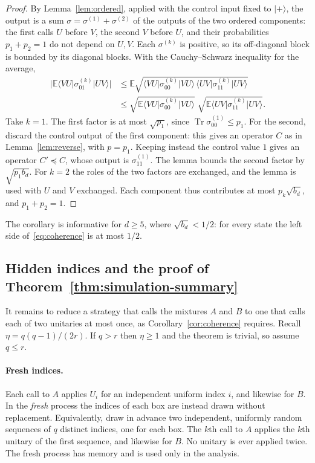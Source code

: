 \documentclass[11pt,letterpaper]{article}
\theoremstyle{definition}\newtheorem{definition}[theorem]{Definition}
\newcommand{\E}{\mathbb E}
\newcommand{\Tr}{\operatorname{Tr}}
\newcommand{\ket}[1]{\lvert#1\rangle}
\newcommand{\bra}[1]{\langle#1\rvert}
\begin{document}
\begin{proof}
By Lemma~\ref{lem:ordered}, applied with the control input fixed to
$\ket+$, the output is a sum $\sigma=\sigma^{(1)}+\sigma^{(2)}$ of the
outputs of the two ordered components: the first calls $U$ before $V$,
the second $V$ before $U$, and their probabilities $p_1+p_2=1$ do not
depend on $U,V$.
Each $\sigma^{(k)}$ is positive, so its off-diagonal block is bounded
by its diagonal blocks. With the Cauchy--Schwarz inequality for the
average,
\begin{align*}
 \bigl|\E\bra{VU}\sigma^{(k)}_{01}\ket{UV}\bigr|
 &\le\E\sqrt{\bra{VU}\sigma^{(k)}_{00}\ket{VU}\,\bra{UV}\sigma^{(k)}_{11}\ket{UV}}\\
 &\le\sqrt{\E\bra{VU}\sigma^{(k)}_{00}\ket{VU}}\;
     \sqrt{\E\bra{UV}\sigma^{(k)}_{11}\ket{UV}} .
\end{align*}
Take $k=1$. The first factor is at most $\sqrt{p_1}$, since
$\Tr\sigma^{(1)}_{00}\le p_1$. For the second, discard the control
output of the first component: this gives an operator $C$ as in
Lemma~\ref{lem:reverse}, with $p=p_1$. Keeping instead the control
value $1$ gives an operator $C'\preceq C$, whose output is
$\sigma^{(1)}_{11}$. The lemma bounds the second factor by
$\sqrt{p_1b_d}$. For $k=2$ the roles of the two factors are exchanged,
and the lemma is used with $U$ and $V$ exchanged. Each component thus
contributes at most $p_k\sqrt{b_d}$, and $p_1+p_2=1$.
\end{proof}

The corollary is informative for $d\ge5$, where $\sqrt{b_d}<1/2$: for
every state the left side of~\eqref{eq:coherence} is at most $1/2$.

\subsection{Hidden indices and the proof of Theorem~\ref{thm:simulation-summary}}\label{sec:hidden}\label{rem:approx-content}

It remains to reduce a strategy that calls the mixtures $A$ and $B$ to
one that calls each of two unitaries at most once, as
Corollary~\ref{cor:coherence} requires. Recall
$\eta=q(q-1)/(2r)$. If $q>r$ then $\eta\ge1$ and the theorem is
trivial, so assume $q\le r$.

\paragraph{Fresh indices.}
Each call to $A$ applies $U_i$ for an independent uniform index $i$,
and likewise for $B$. In the \emph{fresh} process the indices of each
box are instead drawn without replacement. Equivalently, draw in
advance two independent, uniformly random sequences of $q$ distinct
indices, one for each box. The $k$th call to $A$ applies the $k$th
unitary of the first sequence, and likewise for $B$. No unitary is ever
applied twice. The fresh process has memory and is used only in the
analysis.
\end{document}
